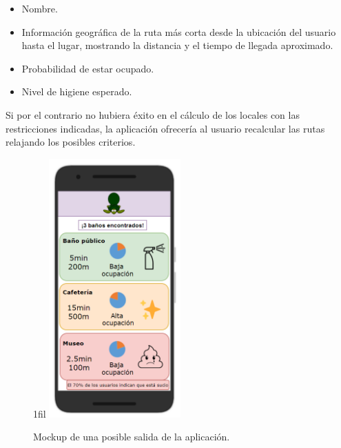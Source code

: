 \documentclass[13pt,a4paper]{article}
\makeatletter
\newcommand*{\centerfloat}{%
  \parindent \z@
  \leftskip \z@ \@plus 1fil \@minus \textwidth
  \rightskip\leftskip
  \parfillskip \z@skip}
\makeatother
\begin{document}
\begin{itemize}
  \item Nombre.
  \item Información geográfica de la ruta más corta desde la ubicación del usuario hasta el lugar, mostrando la distancia y el tiempo de llegada aproximado.
  \item Probabilidad de estar ocupado.
  \item Nivel de higiene esperado.
\end{itemize}

Si por el contrario no hubiera éxito en el cálculo de los locales con las restricciones indicadas, la aplicación ofrecería al usuario recalcular las rutas relajando los posibles criterios.

\begin{figure}[H]
  \centerfloat
  \includegraphics[width=0.45\textwidth]{img/4.png}
  \caption{Mockup de una posible salida de la aplicación.}
  \label{output}
\end{figure}


\end{document}
